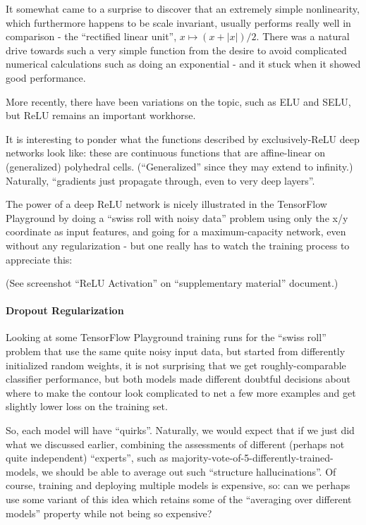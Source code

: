\documentclass[11pt]{article}
\begin{document}
It somewhat came to a surprise to discover that an extremely simple
nonlinearity, which furthermore happens to be scale invariant, usually
performs really well in comparison - the ``rectified linear unit'',
\(x\mapsto (x+|x|)/2\). There was a natural drive towards such a very
simple function from the desire to avoid complicated numerical
calculations such as doing an exponential - and it stuck when it showed
good performance.

More recently, there have been variations on the topic, such as ELU and
SELU, but ReLU remains an important workhorse.

It is interesting to ponder what the functions described by
exclusively-ReLU deep networks look like: these are continuous functions
that are affine-linear on (generalized) polyhedral cells.
(``Generalized'' since they may extend to infinity.) Naturally,
``gradients just propagate through, even to very deep layers''.

The power of a deep ReLU network is nicely illustrated in the TensorFlow
Playground by doing a ``swiss roll with noisy data'' problem using only
the x/y coordinate as input features, and going for a maximum-capacity
network, even without any regularization - but one really has to watch
the training process to appreciate this:

(See screenshot ``ReLU Activation'' on ``supplementary material''
document.)

\hypertarget{dropout-regularization}{%
\paragraph{\texorpdfstring{\textbf{Dropout
Regularization}}{Dropout Regularization}}\label{dropout-regularization}}

Looking at some TensorFlow Playground training runs for the ``swiss
roll'' problem that use the same quite noisy input data, but started
from differently initialized random weights, it is not surprising that
we get roughly-comparable classifier performance, but both models made
different doubtful decisions about where to make the contour look
complicated to net a few more examples and get slightly lower loss on
the training set.

So, each model will have ``quirks''. Naturally, we would expect that if
we just did what we discussed earlier, combining the assessments of
different (perhaps not quite independent) ``experts'', such as
majority-vote-of-5-differently-trained-models, we should be able to
average out such ``structure hallucinations''. Of course, training and
deploying multiple models is expensive, so: can we perhaps use some
variant of this idea which retains some of the ``averaging over
different models'' property while not being so expensive?
\end{document}
